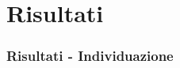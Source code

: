\documentclass[c]{beamer}
\begin{document}

\section{Risultati}
\begin{frame}
\frametitle{Risultati - Individuazione}
\end{frame}

\end{document}
